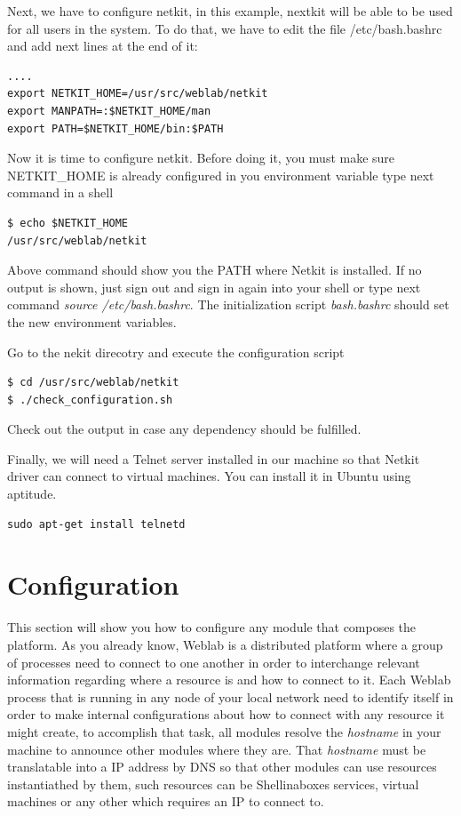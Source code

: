 \documentclass{article}
\begin{document}
Next, we have to configure netkit, in this example, nextkit will be able to be used for all users in the system. To do that, we have to edit the file /etc/bash.bashrc and add next lines at the end of it:

\begin{verbatim}
....
export NETKIT_HOME=/usr/src/weblab/netkit
export MANPATH=:$NETKIT_HOME/man
export PATH=$NETKIT_HOME/bin:$PATH
\end{verbatim}

Now it is time to configure netkit. Before doing it, you must make sure NETKIT\_HOME is already configured in you environment variable type next command in a shell

\begin{verbatim}
$ echo $NETKIT_HOME
/usr/src/weblab/netkit
\end{verbatim}

Above command should show you the PATH where Netkit is installed. If no output is shown, just sign out and sign in again into your shell or type next command \textit{source /etc/bash.bashrc}. The initialization script \textit{bash.bashrc} should set the new environment variables.

Go to the nekit direcotry and execute the configuration script

\begin{verbatim}
$ cd /usr/src/weblab/netkit
$ ./check_configuration.sh
\end{verbatim}

Check out the output in case any dependency should be fulfilled.

Finally, we will need a Telnet server installed in our machine so that Netkit driver can connect to virtual machines. You can install it in Ubuntu using aptitude.

\begin{verbatim}
sudo apt-get install telnetd
\end{verbatim}

\section{Configuration}
This section will show you how to configure any module that composes the platform. As you already know, Weblab is a distributed platform where a group of processes need to connect to one another in order to interchange relevant information regarding where a resource is and how to connect to it. Each Weblab process that is running in any node of your local network need to identify itself in order to make internal configurations about how to connect with any resource it might create, to accomplish that task, all modules resolve the \textit{hostname} in your machine to announce other modules where they are. That \textit{hostname} must be translatable into a IP address by DNS so that other modules can use resources instantiathed by them, such resources can be Shellinaboxes services, virtual machines or any other which requires an IP to connect to.
\end{document}
